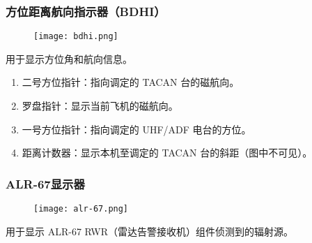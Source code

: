 \subsubsection{方位距离航向指示器（BDHI）}

\begin{figure}[htb]
  \center
  \texttt{[image: bdhi.png]}
\end{figure}
用于显示方位角和航向信息。

\begin{enumerate}
  \item 二号方位指针：指向调定的 TACAN 台的磁航向。
  \item 罗盘指针：显示当前飞机的磁航向。
  \item 一号方位指针：指向调定的 UHF/ADF 电台的方位。
  \item 距离计数器：显示本机至调定的 TACAN 台的斜距（图中不可见）。
\end{enumerate}

\subsubsection{ALR-67显示器}

\begin{figure}[htb]
  \center
  \texttt{[image: alr-67.png]}
\end{figure}
用于显示 ALR-67 RWR（雷达告警接收机）组件侦测到的辐射源。


